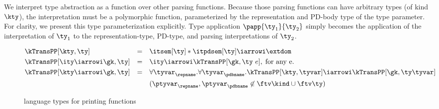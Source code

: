 We interpret type abstraction as a function over other parsing
functions. Because those parsing functions can have
arbitrary \ddc{} types (of kind $\kty$), the interpretation must be a
polymorphic function, parameterized by the representation and PD-body
type of the \ddc{} type parameter.  For clarity, we present
this type parameterization explicitly.  Type application $\papp
{\ty_1}{\ty_2}$ simply becomes the application of the interpretation
of $\ty_1$ to the representation-type, PD-type, and parsing
interpretations of $\ty_2$.



\begin{figure}
\small
\fbox{$\kTransPP[\gk,\ty] = \ity$} 
    
\begin{align*}
  &\kTransPP[\kty,\ty] & = & \quad \itsem[\ty] * \itpdsem[\ty] \iarrowi \extdom 
   \\
   &\kTransPP[\ity \iarrowi \gk,\ty] & = & \quad \ity \iarrowi \kTransPP[\gk,\ty\ e],
   \; \mbox{for any e}.
   \\
   &\kTransPP[\kty \iarrowi \gk,\ty] & = & \quad 
      \forall\tyvar_\repname.\forall\tyvar_\pdbname.
         \kTransPP[\kty,\tyvar] \iarrowi \kTransPP[\gk,\ty \tyvar] \\
         & & & \quad (\ptyvar_\repname, \ptyvar_\pdbname \not \in \ftv \kind \cup
         \ftv \ty)
\end{align*}  
  \caption{\Implang{} language types for printing functions}
  \label{fig:printer-types}
\end{figure}

